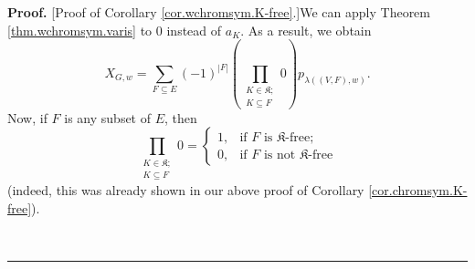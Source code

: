 \documentclass[numbers=enddot,12pt,final,onecolumn,notitlepage]{scrartcl}%
\theoremstyle{definition}
\newenvironment{proof}[1][Proof]{\noindent\textbf{#1.} }{\ \rule{0.5em}{0.5em}}
\newenvironment{verlong}{}{}
\let\sumnonlimits\sum
\let\prodnonlimits\prod
\renewcommand{\sum}{\sumnonlimits\limits}
\renewcommand{\prod}{\prodnonlimits\limits}
\begin{document}
\begin{verlong}
\begin{proof}
[Proof of Corollary \ref{cor.wchromsym.K-free}.]We can apply Theorem
\ref{thm.wchromsym.varis} to $0$ instead of $a_{K}$. As a result, we obtain%
\begin{equation}
X_{G,w}=\sum_{F\subseteq E}\left(  -1\right)  ^{\left\vert F\right\vert
}\left(  \prod_{\substack{K\in\mathfrak{K};\\K\subseteq F}}0\right)
p_{\lambda\left(  \left(  V,F\right)  ,w\right)  }.
\label{pf.cor.wchromsym.K-free.0}%
\end{equation}
Now, if $F$ is any subset of $E$, then%
\begin{equation}
\prod_{\substack{K\in\mathfrak{K};\\K\subseteq F}}0=%
\begin{cases}
1, & \text{if }F\text{ is }\mathfrak{K}\text{-free;}\\
0, & \text{if }F\text{ is not }\mathfrak{K}\text{-free}%
\end{cases}
\label{pf.cor.wchromsym.K-free.1}%
\end{equation}
(indeed, this was already shown in our above proof of Corollary
\ref{cor.chromsym.K-free}).


\end{proof}
\end{verlong}
\end{document}
